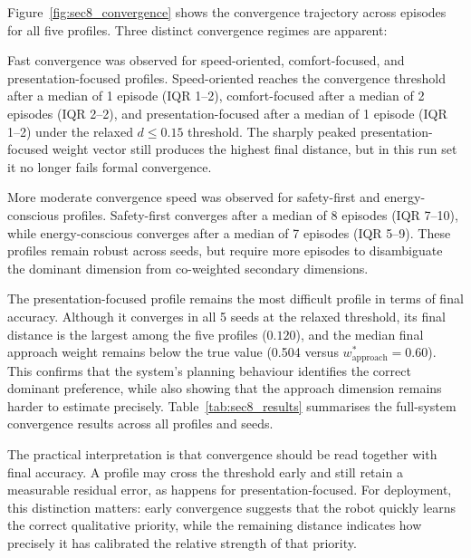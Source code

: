 Figure~\ref{fig:sec8_convergence} shows the convergence trajectory across episodes for all five profiles. Three distinct convergence regimes are apparent:

Fast convergence was observed for speed-oriented, comfort-focused, and presentation-focused profiles. Speed-oriented reaches the convergence threshold after a median of 1 episode (IQR 1--2), comfort-focused after a median of 2 episodes (IQR 2--2), and presentation-focused after a median of 1 episode (IQR 1--2) under the relaxed \(d \leq 0.15\) threshold. The sharply peaked presentation-focused weight vector still produces the highest final distance, but in this run set it no longer fails formal convergence.

More moderate convergence speed was observed for safety-first and energy-conscious profiles. Safety-first converges after a median of 8 episodes (IQR 7--10), while energy-conscious converges after a median of 7 episodes (IQR 5--9). These profiles remain robust across seeds, but require more episodes to disambiguate the dominant dimension from co-weighted secondary dimensions.

The presentation-focused profile remains the most difficult profile in terms of final accuracy. Although it converges in all 5 seeds at the relaxed threshold, its final distance is the largest among the five profiles (\(0.120\)), and the median final approach weight remains below the true value (0.504 versus \(w^*_{\mathrm{approach}}=0.60\)). This confirms that the system's planning behaviour identifies the correct dominant preference, while also showing that the approach dimension remains harder to estimate precisely. Table~\ref{tab:sec8_results} summarises the full-system convergence results across all profiles and seeds.

The practical interpretation is that convergence should be read together with final accuracy. A profile may cross the threshold early and still retain a measurable residual error, as happens for presentation-focused. For deployment, this distinction matters: early convergence suggests that the robot quickly learns the correct qualitative priority, while the remaining distance indicates how precisely it has calibrated the relative strength of that priority.

